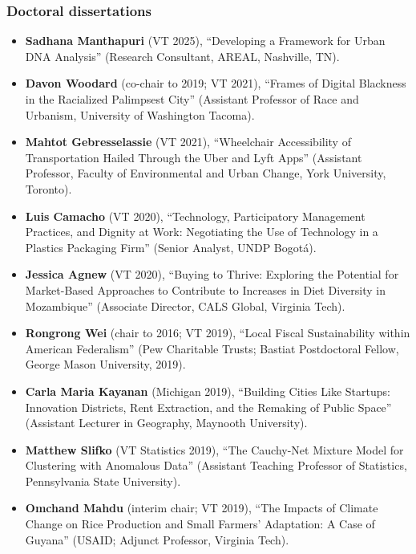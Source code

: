 \documentclass[letter,11pt]{article}
\begin{document}
\subsubsection*{Doctoral dissertations}
\begin{itemize}[--]
\itemsep0em
\item \textbf{Sadhana Manthapuri} (VT 2025), \enquote{Developing a Framework for Urban DNA Analysis} (Research Consultant, AREAL, Nashville, TN).
\item \textbf{Davon Woodard} (co-chair to 2019; VT 2021), \enquote{Frames of Digital Blackness in the Racialized Palimpsest City} (Assistant Professor of Race and Urbanism, University of Washington Tacoma).
\item \textbf{Mahtot Gebresselassie} (VT 2021), \enquote{Wheelchair Accessibility of Transportation Hailed Through the Uber and Lyft Apps} (Assistant Professor, Faculty of Environmental and Urban Change, York University, Toronto).
\item \textbf{Luis Camacho} (VT 2020), \enquote{Technology, Participatory Management Practices, and Dignity at Work: Negotiating the Use of Technology in a Plastics Packaging Firm} (Senior Analyst, UNDP Bogot\'{a}).
\item \textbf{Jessica Agnew} (VT 2020), \enquote{Buying to Thrive: Exploring the Potential for Market-Based Approaches to Contribute to Increases in Diet Diversity in Mozambique} (Associate Director, CALS Global, Virginia Tech).
\item \textbf{Rongrong Wei} (chair to 2016; VT 2019), \enquote{Local Fiscal Sustainability within American Federalism} (Pew Charitable Trusts; Bastiat Postdoctoral Fellow, George Mason University, 2019).
\item \textbf{Carla Maria Kayanan} (Michigan 2019), \enquote{Building Cities Like Startups: Innovation Districts, Rent Extraction, and the Remaking of Public Space} (Assistant Lecturer in Geography, Maynooth University).
\item \textbf{Matthew Slifko} (VT Statistics 2019), \enquote{The Cauchy-Net Mixture Model for Clustering with Anomalous Data} (Assistant Teaching Professor of Statistics, Pennsylvania State University).
\item \textbf{Omchand Mahdu} (interim chair; VT 2019), \enquote{The Impacts of Climate Change on Rice Production and Small Farmers' Adaptation: A Case of Guyana} (\mbox{USAID}; Adjunct Professor, Virginia Tech).

\end{itemize}
\end{document}
